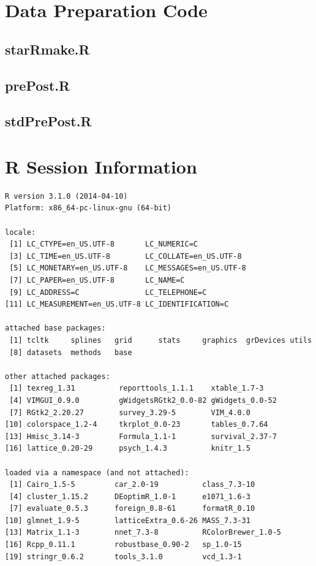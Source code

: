 \documentclass[doc]{apa6}\usepackage[]{graphicx}\usepackage[]{color}
\makeatletter
\newenvironment{kframe}{%
 \def\at@end@of@kframe{}%
 \ifinner\ifhmode%
  \def\at@end@of@kframe{\end{minipage}}%
  \begin{minipage}{\columnwidth}%
 \fi\fi%
 \def\FrameCommand##1{\hskip\@totalleftmargin \hskip-\fboxsep
 \colorbox{shadecolor}{##1}\hskip-\fboxsep
     \hskip-\linewidth \hskip-\@totalleftmargin \hskip\columnwidth}%
 \MakeFramed {\advance\hsize-\width
   \@totalleftmargin\z@ \linewidth\hsize
   \@setminipage}}%
 {\par\unskip\endMakeFramed%
 \at@end@of@kframe}
\newenvironment{knitrout}{}{} %
\makeatother
\begin{document}
\clearpage
\clearpage
\begin{appendices}
\section{Data Preparation Code}
\label{rcode}
\subsection{starRmake.R}

\subsection{prePost.R}

\subsection{stdPrePost.R}

\clearpage
\section{R Session Information}
\begin{knitrout}
\color{fgcolor}\begin{kframe}
\begin{verbatim}
R version 3.1.0 (2014-04-10)
Platform: x86_64-pc-linux-gnu (64-bit)

locale:
 [1] LC_CTYPE=en_US.UTF-8       LC_NUMERIC=C              
 [3] LC_TIME=en_US.UTF-8        LC_COLLATE=en_US.UTF-8    
 [5] LC_MONETARY=en_US.UTF-8    LC_MESSAGES=en_US.UTF-8   
 [7] LC_PAPER=en_US.UTF-8       LC_NAME=C                 
 [9] LC_ADDRESS=C               LC_TELEPHONE=C            
[11] LC_MEASUREMENT=en_US.UTF-8 LC_IDENTIFICATION=C       

attached base packages:
 [1] tcltk     splines   grid      stats     graphics  grDevices utils    
 [8] datasets  methods   base     

other attached packages:
 [1] texreg_1.31          reporttools_1.1.1    xtable_1.7-3        
 [4] VIMGUI_0.9.0         gWidgetsRGtk2_0.0-82 gWidgets_0.0-52     
 [7] RGtk2_2.20.27        survey_3.29-5        VIM_4.0.0           
[10] colorspace_1.2-4     tkrplot_0.0-23       tables_0.7.64       
[13] Hmisc_3.14-3         Formula_1.1-1        survival_2.37-7     
[16] lattice_0.20-29      psych_1.4.3          knitr_1.5           

loaded via a namespace (and not attached):
 [1] Cairo_1.5-5         car_2.0-19          class_7.3-10       
 [4] cluster_1.15.2      DEoptimR_1.0-1      e1071_1.6-3        
 [7] evaluate_0.5.3      foreign_0.8-61      formatR_0.10       
[10] glmnet_1.9-5        latticeExtra_0.6-26 MASS_7.3-31        
[13] Matrix_1.1-3        nnet_7.3-8          RColorBrewer_1.0-5 
[16] Rcpp_0.11.1         robustbase_0.90-2   sp_1.0-15          
[19] stringr_0.6.2       tools_3.1.0         vcd_1.3-1          
\end{verbatim}
\end{kframe}
\end{knitrout}

\end{appendices}
\end{document}
